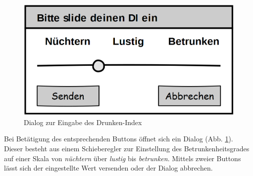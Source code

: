 \begin{figure}[H]
\centering
\includegraphics[width=0.45\linewidth]{Bilder/MockDiSlider}
\caption{Dialog zur Eingabe des Drunken-Index}
\label{fig:MockDiSlider}
\end{figure}

Bei Betätigung des entsprechenden Buttons öffnet sich ein Dialog (Abb. \ref{fig:MockDiSlider}). Dieser besteht aus einem Schieberegler zur Einstellung des Betrunkenheitsgrades auf einer Skala von \textit{nüchtern} über \textit{lustig} bis \textit{betrunken}. Mittels zweier Buttons lässt sich der eingestellte Wert versenden oder der Dialog abbrechen.